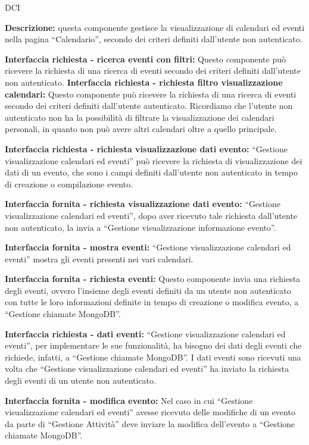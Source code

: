 \begin{listaPersonale}{DCI}

    \textbf{Descrizione:} questa componente gestisce la visualizzazione di calendari ed eventi nella pagina “Calendario”, secondo dei criteri definiti dall'utente non autenticato.

    \textbf{Interfaccia richiesta - ricerca eventi con filtri:} Questo componente può ricevere la richiesta di una ricerca di eventi secondo dei criteri definiti dall'utente non autenticato.
    \textbf{Interfaccia richiesta - richiesta filtro visualizzazione
        calendari:}  Questo componente può ricevere la richiesta di una ricerca di eventi secondo dei criteri definiti dall'utente autenticato. Ricordiamo che l'utente non autenticato non ha la possibilità di filtrare la visualizzazione dei calendari personali, in quanto non può avere altri calendari oltre a quello principale.

    \textbf{Interfaccia richiesta - richiesta visualizzazione dati evento:} “Gestione visualizzazione calendari ed eventi” può ricevere la richiesta di visualizzazione dei dati di un evento, che sono i campi definiti dall'utente non autenticato in tempo di creazione o compilazione evento.

    \textbf{Interfaccia fornita - richiesta visualizzazione dati evento:}  “Gestione visualizzazione calendari ed eventi”, dopo aver ricevuto tale richiesta dall'utente non autenticato, la invia a “Gestione visualizzazione informazione evento”.

    \textbf{Interfaccia fornita - mostra eventi:} “Gestione visualizzazione calendari ed eventi” mostra gli eventi presenti nei vari calendari.

    \textbf{Interfaccia fornita - richiesta eventi:} Questo componente invia una richiesta degli eventi, ovvero l'insieme degli eventi definiti da un utente non autenticato con tutte le loro informazioni definite in tempo di creazione o modifica evento, a “Gestione chiamate MongoDB”.

    \textbf{Interfaccia richiesta - dati eventi:} “Gestione visualizzazione calendari ed eventi”, per implementare le sue funzionalità, ha bisogno dei dati degli eventi che richiede, infatti, a “Gestione chiamate MongoDB”. I dati eventi sono ricevuti una volta che “Gestione visualizzazione calendari ed eventi” ha inviato la richiesta degli eventi di un utente non autenticato.

    \textbf{Interfaccia fornita - modifica evento:} Nel caso in cui “Gestione visualizzazione calendari ed eventi” avesse ricevuto delle modifiche di un evento da parte di “Gestione Attività” deve inviare la modifica dell'evento a “Gestione chiamate MongoDB”.


\end{listaPersonale}
